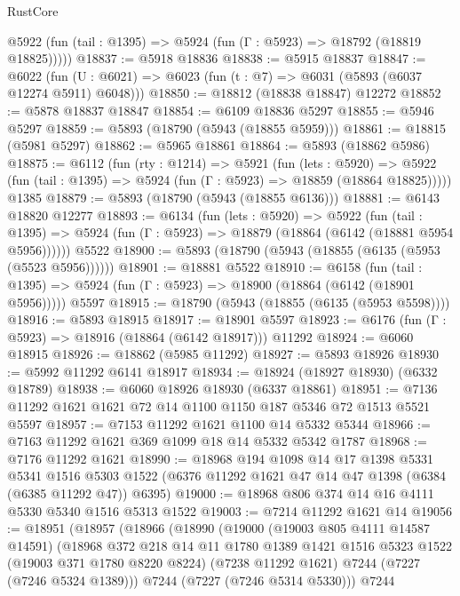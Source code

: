 \begin{lexlean}{RustCore}
\begin{coremodule}
      @5922 (fun (tail : @1395) => @5924 (fun (Γ : @5923) => @18792 (@18819 @18825)))))
@18837 := @5918 @18836
@18838 := @5915 @18837
@18847 := @6022
    (fun (U : @6021) => @6023 (fun (t : @7) => @6031 (@5893 (@6037 @12274 @5911) @6048)))
@18850 := @18812 (@18838 @18847) @12272
@18852 := @5878 @18837 @18847
@18854 := @6109 @18836 @5297
@18855 := @5946 @5297
@18859 := @5893 (@18790 (@5943 (@18855 @5959)))
@18861 := @18815 (@5981 @5297)
@18862 := @5965 @18861
@18864 := @5893 (@18862 @5986)
@18875 := @6112
    (fun (rty : @1214) =>
    @5921
      (fun (lets : @5920) =>
      @5922 (fun (tail : @1395) => @5924 (fun (Γ : @5923) => @18859 (@18864 @18825)))))
    @1385
@18879 := @5893 (@18790 (@5943 (@18855 @6136)))
@18881 := @6143 @18820 @12277
@18893 := @6134
    (fun (lets : @5920) =>
    @5922
      (fun (tail : @1395) =>
      @5924 (fun (Γ : @5923) => @18879 (@18864 (@6142 (@18881 @5954 @5956))))))
    @5522
@18900 := @5893 (@18790 (@5943 (@18855 (@6135 (@5953 (@5523 @5956))))))
@18901 := @18881 @5522
@18910 := @6158
    (fun (tail : @1395) => @5924 (fun (Γ : @5923) => @18900 (@18864 (@6142 (@18901 @5956)))))
    @5597
@18915 := @18790 (@5943 (@18855 (@6135 (@5953 @5598))))
@18916 := @5893 @18915
@18917 := @18901 @5597
@18923 := @6176 (fun (Γ : @5923) => @18916 (@18864 (@6142 @18917))) @11292
@18924 := @6060 @18915
@18926 := @18862 (@5985 @11292)
@18927 := @5893 @18926
@18930 := @5992 @11292 @6141 @18917
@18934 := @18924 (@18927 @18930) (@6332 @18789)
@18938 := @6060 @18926 @18930 (@6337 @18861)
@18951 := @7136 @11292 @1621 @1621 @72 @14 @1100 @1150 @187 @5346 @72 @1513 @5521 @5597
@18957 := @7153 @11292 @1621 @1100 @14 @5332 @5344
@18966 := @7163 @11292 @1621 @369 @1099 @18 @14 @5332 @5342 @1787
@18968 := @7176 @11292 @1621
@18990 := @18968
    @194
    @1098
    @14
    @17
    @1398
    @5331
    @5341
    @1516
    @5303
    @1522
    (@6376 @11292 @1621 @47 @14 @47 @1398 (@6384 (@6385 @11292 @47)) @6395)
@19000 := @18968 @806 @374 @14 @16 @4111 @5330 @5340 @1516 @5313 @1522
@19003 := @7214 @11292 @1621 @14
@19056 := @18951
    (@18957
      (@18966
        (@18990
          (@19000
            (@19003 @805 @4111 @14587 @14591)
            (@18968
              @372
              @218
              @14
              @11
              @1780
              @1389
              @1421
              @1516
              @5323
              @1522
              (@19003 @371 @1780 @8220 @8224)
              (@7238 @11292 @1621)
              @7244
              (@7227 (@7246 @5324 @1389)))
            @7244
            (@7227 (@7246 @5314 @5330)))
          @7244

\end{coremodule}
\end{lexlean}
